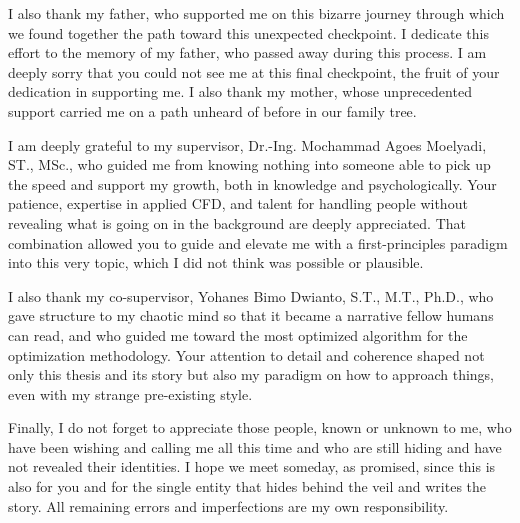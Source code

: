 \noindent I also thank my father, who supported me on this bizarre journey through which we found together the path toward this unexpected checkpoint. I dedicate this effort to the memory of my father, who passed away during this process. I am deeply sorry that you could not see me at this final checkpoint, the fruit of your dedication in supporting me. I also thank my mother, whose unprecedented support carried me on a path unheard of before in our family tree.

\noindent I am deeply grateful to my supervisor, Dr.-Ing. Mochammad Agoes Moelyadi, ST., MSc., who guided me from knowing nothing into someone able to pick up the speed and support my growth, both in knowledge and psychologically. Your patience, expertise in applied CFD, and talent for handling people without revealing what is going on in the background are deeply appreciated. That combination allowed you to guide and elevate me with a first-principles paradigm into this very topic, which I did not think was possible or plausible.

\noindent I also thank my co-supervisor, Yohanes Bimo Dwianto, S.T., M.T., Ph.D., who gave structure to my chaotic mind so that it became a narrative fellow humans can read, and who guided me toward the most optimized algorithm for the optimization methodology. Your attention to detail and coherence shaped not only this thesis and its story but also my paradigm on how to approach things, even with my strange pre-existing style.

\noindent Finally, I do not forget to appreciate those people, known or unknown to me, who have been wishing and calling me all this time and who are still hiding and have not revealed their identities. I hope we meet someday, as promised, since this is also for you and for the single entity that hides behind the veil and writes the story. All remaining errors and imperfections are my own responsibility.
